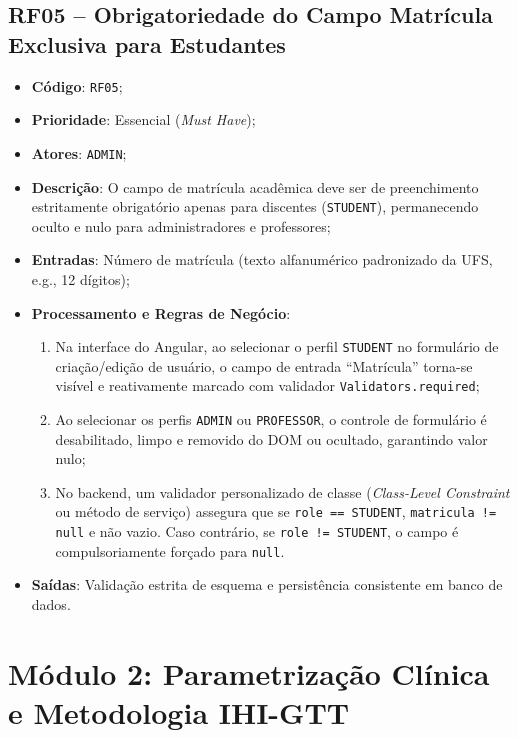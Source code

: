\subsection{RF05 -- Obrigatoriedade do Campo Matrícula Exclusiva para Estudantes}
\begin{itemize}
    \item \textbf{Código}: \texttt{RF05};
    \item \textbf{Prioridade}: Essencial (\textit{Must Have});
    \item \textbf{Atores}: \texttt{ADMIN};
    \item \textbf{Descrição}: O campo de matrícula acadêmica deve ser de preenchimento estritamente obrigatório apenas para discentes (\texttt{STUDENT}), permanecendo oculto e nulo para administradores e professores;
    \item \textbf{Entradas}: Número de matrícula (texto alfanumérico padronizado da UFS, e.g., 12 dígitos);
    \item \textbf{Processamento e Regras de Negócio}:
    \begin{enumerate}
        \item Na interface do Angular, ao selecionar o perfil \texttt{STUDENT} no formulário de criação/edição de usuário, o campo de entrada ``Matrícula'' torna-se visível e reativamente marcado com validador \texttt{Validators.required};
        \item Ao selecionar os perfis \texttt{ADMIN} ou \texttt{PROFESSOR}, o controle de formulário é desabilitado, limpo e removido do DOM ou ocultado, garantindo valor nulo;
        \item No backend, um validador personalizado de classe (\textit{Class-Level Constraint} ou método de serviço) assegura que se \texttt{role == STUDENT}, \texttt{matricula != null} e não vazio. Caso contrário, se \texttt{role != STUDENT}, o campo é compulsoriamente forçado para \texttt{null}.
    \end{enumerate}
    \item \textbf{Saídas}: Validação estrita de esquema e persistência consistente em banco de dados.
\end{itemize}

\section{Módulo 2: Parametrização Clínica e Metodologia IHI-GTT}
\label{sec_mod2_gtt}

